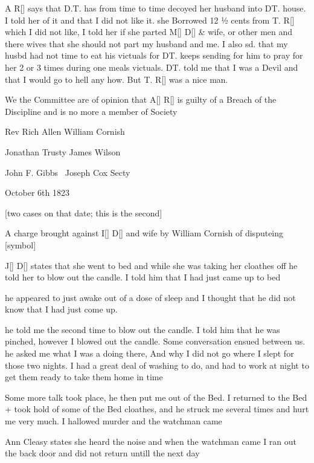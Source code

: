 \documentclass[output=paper,colorlinks,citecolor=brown]{langscibook}
\begin{document}
A R[] says that D.T. has from time to time decoyed her husband into DT. house. I told her of it and that I did not like it. she Borrowed 12 ½ cents from T. R[] which I did not like, I told her if she parted M[] D[] \& wife, or other men and there wives that she should not part my husband and me. I also sd. that my husbd had not time to eat his victuals for DT. keeps sending for him to pray for her 2 or 3 times during one meals victuals. DT. told me that I was a Devil and that I would go to hell any how. But T. R[] was a nice man. 

  We the Committee are of opinion that A[] R[] is guilty of a Breach of the Discipline and is no more a member of Society\medskip

Rev Rich Allen \qquad   William Cornish

Jonathan Trusty \qquad    James Wilson

John F. Gibbs~    \qquad    Joseph Cox Secty %
\z

\ea%
    \label{ex:singler:3}
    
                                          October 6th 1823

[two cases on that date; this is the second]

A charge brought against I[] D[] and wife by William Cornish of disputeing [symbol]

J[] D[] states that she went to bed and while she was taking her cloathes off he told her to blow out the candle. I told him that I had just came up to bed 

he appeared to just awake out of a dose of sleep and I thought that he did not know that I had just come up. 

he told me the second time to blow out the candle. I told him that he was pinched, however I blowed out the candle. Some conversation ensued between us. he asked me what I was a doing there, And why I did not go where I slept for those two nights. I had a great deal of washing to do, and had to work at night to get them ready to take them home in time

Some more talk took place, he then put me out of the Bed. I returned to the Bed + took hold of some of the Bed cloathes, and he struck me several times and hurt me very much. I hallowed murder and the watchman came 

Ann Cleasy states she heard the noise and when the watchman came I ran out the back door and did not return untill the next day
\end{document}
